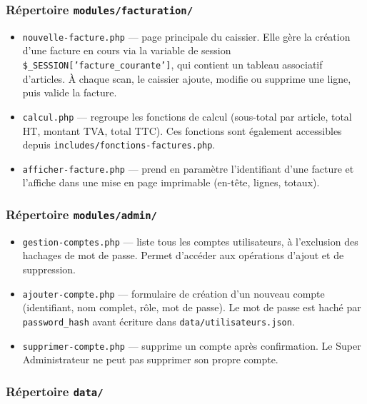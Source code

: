 \documentclass[12pt,a4paper]{article}
\begin{document}
\subsubsection{Répertoire \texttt{modules/facturation/}}

\begin{itemize}[leftmargin=1.5em]
    \item \texttt{nouvelle-facture.php} --- page principale du caissier. Elle gère la création d'une facture en cours via la variable de session \texttt{\$\_SESSION['facture\_courante']}, qui contient un tableau associatif d'articles. À chaque scan, le caissier ajoute, modifie ou supprime une ligne, puis valide la facture.
    \item \texttt{calcul.php} --- regroupe les fonctions de calcul (sous-total par article, total HT, montant TVA, total TTC). Ces fonctions sont également accessibles depuis \texttt{includes/fonctions-factures.php}.
    \item \texttt{afficher-facture.php} --- prend en paramètre l'identifiant d'une facture et l'affiche dans une mise en page imprimable (en-tête, lignes, totaux).
\end{itemize}

\subsubsection{Répertoire \texttt{modules/admin/}}

\begin{itemize}[leftmargin=1.5em]
    \item \texttt{gestion-comptes.php} --- liste tous les comptes utilisateurs, à l'exclusion des hachages de mot de passe. Permet d'accéder aux opérations d'ajout et de suppression.
    \item \texttt{ajouter-compte.php} --- formulaire de création d'un nouveau compte (identifiant, nom complet, rôle, mot de passe). Le mot de passe est haché par \texttt{password\_hash} avant écriture dans \texttt{data/utilisateurs.json}.
    \item \texttt{supprimer-compte.php} --- supprime un compte après confirmation. Le Super Administrateur ne peut pas supprimer son propre compte.
\end{itemize}

\subsubsection{Répertoire \texttt{data/}}
\end{document}
